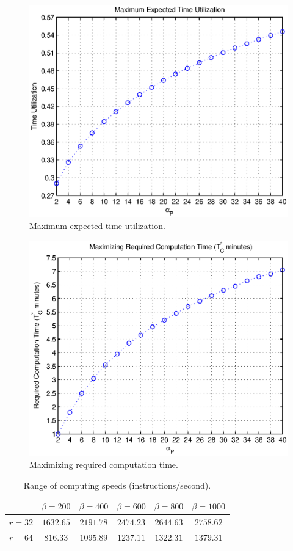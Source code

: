 \begin{figure}
\centering
\includegraphics[width=5in]{Chapter_4_Figures/max_expect_time_util.eps}
\caption{Maximum expected time utilization.}
\label{Figure: max_expect_time_util.eps}
\end{figure}
\begin{figure}
\centering
\includegraphics[width=5in]{Chapter_4_Figures/maximizing_compute_time.eps}
\caption{Maximizing required computation time.}
\label{Figure: maximizing_compute_time.eps}
\end{figure}
\clearpage

\begin{table}
\caption{Range of computing speeds (instructions$/$second).}
\label{Table: Range of computing speeds (instructions/second).}
\begin{center}
\begin{tabular}{|c|c|c|c|c|c|}
\hline
  & $\beta = 200$ & $\beta = 400$ & $\beta = 600$ & $\beta = 800$ & $\beta = 1000$ \\
\hline
$r = 32$ & $1632.65$ & $2191.78$ & $2474.23$ & $2644.63$ & $2758.62$ \\
\hline
$r = 64$ & $816.33$ & $1095.89$ & $1237.11$ & $1322.31$ & $1379.31$ \\
\hline
\end{tabular}
\end{center}
\end{table}